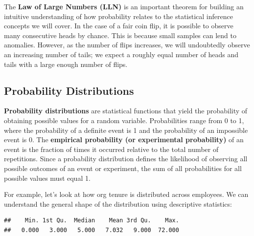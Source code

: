 \documentclass[]{book}
\newenvironment{Shaded}{\begin{snugshade}}{\end{snugshade}}
\newcommand{\CommentTok}[1]{\textcolor[rgb]{0.56,0.35,0.01}{\textit{#1}}}
\newcommand{\KeywordTok}[1]{\textcolor[rgb]{0.13,0.29,0.53}{\textbf{#1}}}
\newcommand{\NormalTok}[1]{#1}
\newcommand{\OperatorTok}[1]{\textcolor[rgb]{0.81,0.36,0.00}{\textbf{#1}}}
\newcommand{\StringTok}[1]{\textcolor[rgb]{0.31,0.60,0.02}{#1}}
\begin{document}
The \textbf{Law of Large Numbers (LLN)} is an important theorem for building an intuitive understanding of how probability relates to the statistical inference concepts we will cover. In the case of a fair coin flip, it is possible to observe many consecutive heads by chance. This is because small samples can lend to anomalies. However, as the number of flips increases, we will undoubtedly observe an increasing number of tails; we expect a roughly equal number of heads and tails with a large enough number of flips.

\hypertarget{probability-distributions}{%
\subsection{Probability Distributions}\label{probability-distributions}}

\textbf{Probability distributions} are statistical functions that yield the probability of obtaining possible values for a random variable. Probabilities range from 0 to 1, where the probability of a definite event is 1 and the probability of an impossible event is 0. The \textbf{empirical probability (or experimental probability)} of an event is the fraction of times it occurred relative to the total number of repetitions. Since a probability distribution defines the likelihood of observing all possible outcomes of an event or experiment, the sum of all probabilities for all possible values must equal 1.

For example, let's look at how org tenure is distributed across employees. We can understand the general shape of the distribution using descriptive statistics:

\begin{Shaded}
\end{Shaded}

\begin{verbatim}
##    Min. 1st Qu.  Median    Mean 3rd Qu.    Max. 
##   0.000   3.000   5.000   7.032   9.000  72.000
\end{verbatim}
\end{document}
